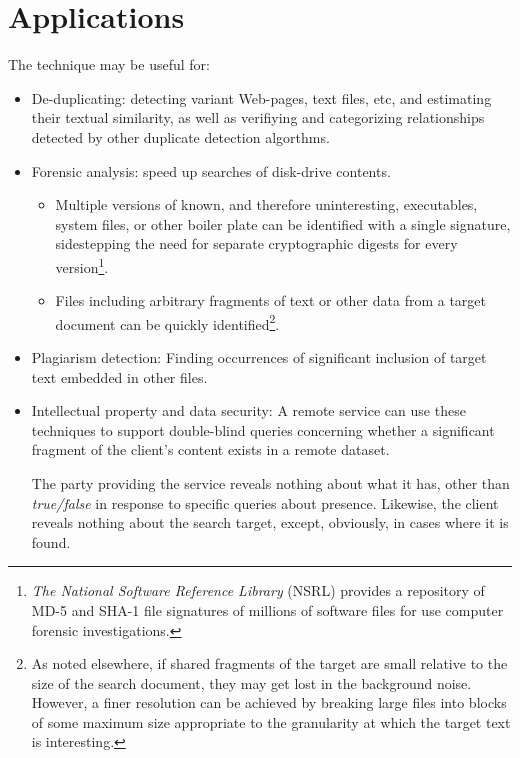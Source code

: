 \documentclass[html]{article}    %
\begin{document}
\section{Applications}
The technique may be useful for:
\begin{itemize}
  \item { De-duplicating: detecting variant Web-pages, text files, etc, and
  estimating their textual similarity, as well as verifiying and categorizing
  relationships detected by other duplicate detection algorthms.
  }
  \item {Forensic analysis: speed up searches of disk-drive contents.
		\begin{itemize}
 		\item{ 
  			Multiple versions of known, and therefore uninteresting, executables,
  			system files, or other boiler plate can be identified with a single
  			signature, sidestepping the need for separate cryptographic digests for 
  			every version\footnote{
 			{\em The National Software Reference Library} (NSRL) provides a repository
 			of MD-5 and SHA-1 file signatures of millions of software files for use
 			computer forensic investigations. }. 
  		}
  		\item{
  			Files including arbitrary fragments of text or other data 
  			from a target document can be quickly identified\footnote{
  				As noted elsewhere, if shared fragments of the target 
  				are small relative to the size of the search document,
  				they may get lost in the background noise. 
  				However, a finer resolution can be achieved by breaking large 
  				files into blocks of some maximum size appropriate to the 
  				granularity at which the target text is interesting.}. 
  		}
		\end{itemize}
  }
  \item {Plagiarism detection: Finding occurrences of significant 
  	inclusion of target text embedded in other files.  
  	}
  \item{Intellectual property and data security: A remote service can use these
  		techniques to support double-blind queries concerning whether a significant
  		fragment of the client's content exists in a remote dataset. 
  		
  		The party providing the service reveals nothing about what it has, other
  		than {\em true/false} in response to specific queries about presence.
  		Likewise, the client reveals nothing about the search target, except,
  		obviously, in cases where it is found. 
  		
}
\end{itemize}
\end{document}
